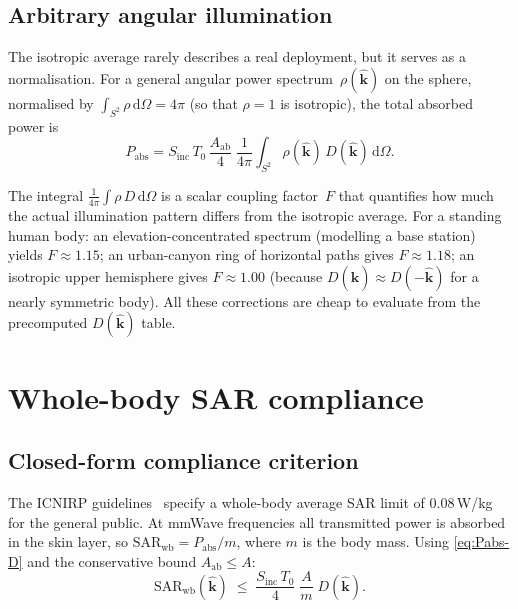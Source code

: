 \documentclass[11pt,a4paper]{article}
\theoremstyle{definition}      %
\newcommand{\khat}{\hat{\bm{k}}}
\newcommand{\Sinc}{S_{\mathrm{inc}}}
\newcommand{\Aab}{A_{\mathrm{ab}}}
\newcommand{\SARwb}{\mathrm{SAR}_{\mathrm{wb}}}
\newcommand{\diff}{\mathrm{d}}        %
\begin{document}
\subsection{Arbitrary angular illumination}\label{sec:angular-spectra}

The isotropic average rarely describes a real deployment, but it serves
as a normalisation.  For a general angular power
spectrum~$\rho(\khat)$ on the sphere, normalised by
$\int_{S^2}\rho\,\diff \Omega=4\pi$ (so that $\rho=1$ is isotropic), the
total absorbed power is
\begin{equation}\label{eq:Pabs-rho}
  \boxed{P_{\mathrm{abs}}
    = \Sinc\,T_0\,\frac{\Aab}{4}\;
    \frac{1}{4\pi}\int_{S^2}\rho(\khat)\,D(\khat)\,\diff \Omega.}
\end{equation}

The integral $\frac{1}{4\pi}\int\rho\,D\,\diff\Omega$ is a scalar
coupling factor~$F$ that quantifies how much the actual illumination
pattern differs from the isotropic average.  For a standing human
body: an elevation-concentrated spectrum (modelling a base station)
yields $F\approx 1.15$; an urban-canyon ring of horizontal paths
gives $F\approx 1.18$; an isotropic upper hemisphere gives
$F\approx 1.00$ (because $D(\khat)\approx D(-\khat)$ for a nearly
symmetric body).  All these corrections are cheap to
evaluate from the precomputed $D(\khat)$ table.


\section{Whole-body SAR compliance}\label{sec:compliance}

\subsection{Closed-form compliance criterion}\label{sec:SAR-criterion}

The ICNIRP guidelines~\cite{ICNIRP2020} specify a whole-body average
SAR limit of $0.08$\,W/kg for the general public.  At mmWave
frequencies all transmitted power is absorbed in the skin layer, so
$\SARwb = P_{\mathrm{abs}}/m$, where $m$ is the body mass.  Using
\cref{eq:Pabs-D} and the conservative bound $\Aab\le A$:
\begin{equation}\label{eq:SARwb}
  \SARwb(\khat) \;\le\;
  \frac{\Sinc\,T_0}{4}\;\frac{A}{m}\;D(\khat).
\end{equation}
\end{document}
